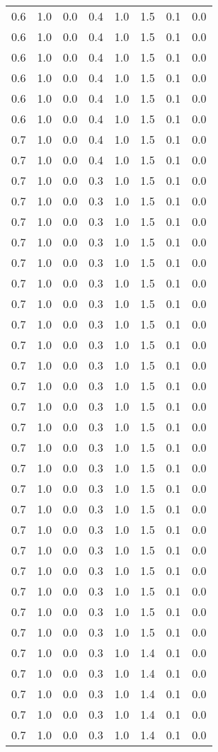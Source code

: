 \begin{tabular}{L{1in}|L{1in}|L{1in}|L{1in}|L{1in}|L{1in}|L{1in}|L{1in}}
0.6&1.0&0.0&0.4&1.0&1.5&0.1&0.0\\
0.6&1.0&0.0&0.4&1.0&1.5&0.1&0.0\\
0.6&1.0&0.0&0.4&1.0&1.5&0.1&0.0\\
0.6&1.0&0.0&0.4&1.0&1.5&0.1&0.0\\
0.6&1.0&0.0&0.4&1.0&1.5&0.1&0.0\\
0.6&1.0&0.0&0.4&1.0&1.5&0.1&0.0\\
0.7&1.0&0.0&0.4&1.0&1.5&0.1&0.0\\
0.7&1.0&0.0&0.4&1.0&1.5&0.1&0.0\\
0.7&1.0&0.0&0.3&1.0&1.5&0.1&0.0\\
0.7&1.0&0.0&0.3&1.0&1.5&0.1&0.0\\
0.7&1.0&0.0&0.3&1.0&1.5&0.1&0.0\\
0.7&1.0&0.0&0.3&1.0&1.5&0.1&0.0\\
0.7&1.0&0.0&0.3&1.0&1.5&0.1&0.0\\
0.7&1.0&0.0&0.3&1.0&1.5&0.1&0.0\\
0.7&1.0&0.0&0.3&1.0&1.5&0.1&0.0\\
0.7&1.0&0.0&0.3&1.0&1.5&0.1&0.0\\
0.7&1.0&0.0&0.3&1.0&1.5&0.1&0.0\\
0.7&1.0&0.0&0.3&1.0&1.5&0.1&0.0\\
0.7&1.0&0.0&0.3&1.0&1.5&0.1&0.0\\
0.7&1.0&0.0&0.3&1.0&1.5&0.1&0.0\\
0.7&1.0&0.0&0.3&1.0&1.5&0.1&0.0\\
0.7&1.0&0.0&0.3&1.0&1.5&0.1&0.0\\
0.7&1.0&0.0&0.3&1.0&1.5&0.1&0.0\\
0.7&1.0&0.0&0.3&1.0&1.5&0.1&0.0\\
0.7&1.0&0.0&0.3&1.0&1.5&0.1&0.0\\
0.7&1.0&0.0&0.3&1.0&1.5&0.1&0.0\\
0.7&1.0&0.0&0.3&1.0&1.5&0.1&0.0\\
0.7&1.0&0.0&0.3&1.0&1.5&0.1&0.0\\
0.7&1.0&0.0&0.3&1.0&1.5&0.1&0.0\\
0.7&1.0&0.0&0.3&1.0&1.5&0.1&0.0\\
0.7&1.0&0.0&0.3&1.0&1.5&0.1&0.0\\
0.7&1.0&0.0&0.3&1.0&1.4&0.1&0.0\\
0.7&1.0&0.0&0.3&1.0&1.4&0.1&0.0\\
0.7&1.0&0.0&0.3&1.0&1.4&0.1&0.0\\
0.7&1.0&0.0&0.3&1.0&1.4&0.1&0.0\\
0.7&1.0&0.0&0.3&1.0&1.4&0.1&0.0\\

\end{tabular}
